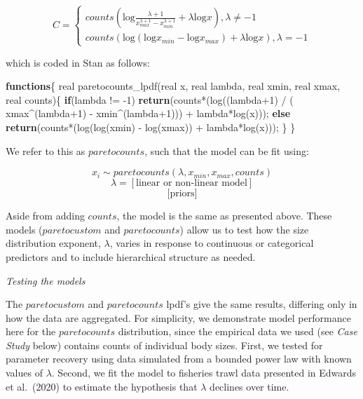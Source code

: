 \documentclass[
  12pt,
]{article}
\newenvironment{Shaded}{\begin{snugshade}}{\end{snugshade}}
\newcommand{\ControlFlowTok}[1]{\textcolor[rgb]{0.13,0.29,0.53}{\textbf{#1}}}
\newcommand{\DataTypeTok}[1]{\textcolor[rgb]{0.13,0.29,0.53}{#1}}
\newcommand{\DecValTok}[1]{\textcolor[rgb]{0.00,0.00,0.81}{#1}}
\newcommand{\KeywordTok}[1]{\textcolor[rgb]{0.13,0.29,0.53}{\textbf{#1}}}
\newcommand{\NormalTok}[1]{#1}
\begin{document}
\[
 C = \begin{cases}\textit{counts}(\text{log}\frac{\lambda + 1}{{x_{max}^{\lambda+1}} - {x_{min}^{\lambda+1}}} + \lambda\text{log}x), \lambda \neq-1 \\
\textit{counts}(\text{log}({{\text{log}x_{min}} - {\text{log}x_{max}}}) + \lambda\text{log}x), \lambda = -1\end{cases}
\]

which is coded in Stan as follows:

\begin{Shaded}
\begin{Highlighting}[]

\KeywordTok{functions}\NormalTok{\{}
  \DataTypeTok{real}\NormalTok{ paretocounts\_lpdf(}\DataTypeTok{real}\NormalTok{ x, }\DataTypeTok{real}\NormalTok{ lambda, }\DataTypeTok{real}\NormalTok{ xmin, }\DataTypeTok{real}\NormalTok{ xmax, }\DataTypeTok{real}\NormalTok{ counts)\{}
    \ControlFlowTok{if}\NormalTok{(lambda != {-}}\DecValTok{1}\NormalTok{)}
    \ControlFlowTok{return}\NormalTok{(counts*(log((lambda+}\DecValTok{1}\NormalTok{) / ( xmax\^{}(lambda+}\DecValTok{1}\NormalTok{) {-} xmin\^{}(lambda+}\DecValTok{1}\NormalTok{))) + lambda*log(x)));}
    \ControlFlowTok{else}
    \ControlFlowTok{return}\NormalTok{(counts*(log(log(xmin) {-} log(xmax)) + lambda*log(x)));}
\NormalTok{  \}}
\NormalTok{\}}
\end{Highlighting}
\end{Shaded}

We refer to this as \(paretocounts\), such that the model can be fit
using:

\[x_i\sim paretocounts(\lambda, x_{min}, x_{max}, counts)\]
\[\lambda = [\text{linear or non-linear model}]\] \[\text{[priors]}\]

Aside from adding \(counts\), the model is the same as presented above.
These models (\(paretocustom\) and \(paretocounts\)) allow us to test
how the size distribution exponent, \(\lambda\), varies in response to
continuous or categorical predictors and to include hierarchical
structure as needed.

\emph{Testing the models}

The \(paretocustom\) and \(paretocounts\) lpdf's give the same results,
differing only in how the data are aggregated. For simplicity, we
demonstrate model performance here for the \(paretocounts\)
distribution, since the empirical data we used (see \emph{Case Study}
below) contains counts of individual body sizes. First, we tested for
parameter recovery using data simulated from a bounded power law with
known values of \(\lambda\). Second, we fit the model to fisheries trawl
data presented in Edwards et al.~(2020) to estimate the hypothesis that
\(\lambda\) declines over time.
\end{document}
